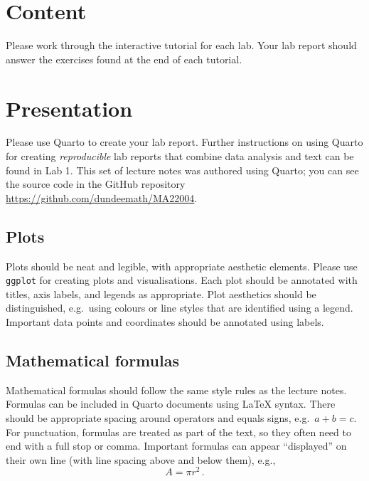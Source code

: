 \documentclass[
  a4paper,
  DIV=11,
  numbers=noendperiod,
  oneside]{scrreprt}
\theoremstyle{definition}
\theoremstyle{definition}
\theoremstyle{plain}
\theoremstyle{plain}
\theoremstyle{definition}
\theoremstyle{remark}
\begin{document}
\section*{Content}\label{w-content}


Please work through the interactive tutorial for each lab. Your lab
report should answer the exercises found at the end of each tutorial.

\section*{Presentation}\label{w-present}


Please use Quarto to create your lab report. Further instructions on
using Quarto for creating \emph{reproducible} lab reports that combine
data analysis and text can be found in Lab 1. This set of lecture notes
was authored using Quarto; you can see the source code in the GitHub
repository \url{https://github.com/dundeemath/MA22004}.

\subsection*{Plots}\label{w-plots}

Plots should be neat and legible, with appropriate aesthetic elements.
Please use \texttt{ggplot} for creating plots and visualisations. Each
plot should be annotated with titles, axis labels, and legends as
appropriate. Plot aesthetics should be distinguished, e.g.~using colours
or line styles that are identified using a legend. Important data points
and coordinates should be annotated using labels.

\subsection*{Mathematical formulas}\label{w-math}

Mathematical formulas should follow the same style rules as the lecture
notes. Formulas can be included in Quarto documents using {\LaTeX}
syntax. There should be appropriate spacing around operators and equals
signs, e.g.~\(a + b = c\). For punctuation, formulas are treated as part
of the text, so they often need to end with a full stop or comma.
Important formulas can appear ``displayed'' on their own line (with line
spacing above and below them), e.g., \[A=πr^2\,.\]
\end{document}
